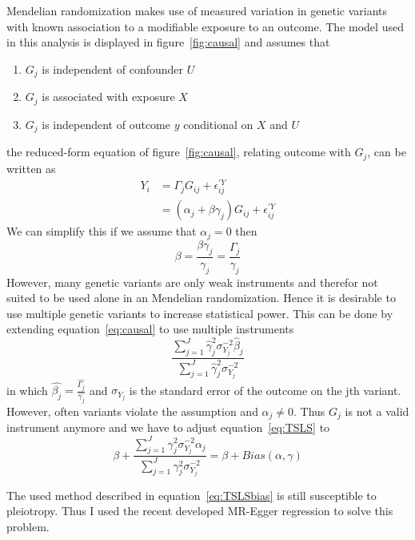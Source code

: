 Mendelian randomization makes use of measured variation in genetic variants with known association to a modifiable exposure to an outcome.
The model used in this analysis is displayed in figure~\ref{fig:causal} and assumes that

\begin{enumerate}
	\item $G_j$ is independent of confounder $U$
	\item $G_j$ is associated with exposure $X$
	\item $G_j$ is independent of outcome $y$ conditional on $X$ and $U$
\end{enumerate}

the reduced-form equation of figure~\ref{fig:causal}, relating outcome with $G_j$, can be written as
\begin{equation}
	\begin{split}
		Y_i &= \Gamma_j G_{ij} + \epsilon_{ij}^{'Y} \\
		&= (\alpha_j + \beta\gamma_j)G_{ij} + \epsilon_{ij}^{'Y}
	\end{split}
\end{equation}
We can simplify this if we assume that $\alpha_j = 0$ then
\begin{equation}
	\beta = \frac{\beta\gamma_j}{\gamma_j}= \frac{\Gamma_j}{\gamma_j}
  \label{eq:causal}
\end{equation}
However, many genetic variants are only weak instruments and therefor not suited to be used alone in an Mendelian randomization.
Hence it is desirable to use multiple genetic variants to increase statistical power.
This can be done by extending equation~\ref{eq:causal} to use multiple instruments
\begin{equation} \label{eq:TSLS}
	\frac{\sum^J_{j=1} \hat{\gamma}_j^2\sigma_{Y_j}^{-2} \hat{\beta}_j}
	{\sum^J_{j=1} \hat{\gamma}_j^2\sigma_{Y_j}^{-2}}
\end{equation}
in which $\hat{\beta_j} = \frac{\hat{\Gamma_j}}{\hat{\gamma_j}}$ and $\sigma_{Y_j}$ is the standard error of the outcome on the jth variant.
However, often variants violate the assumption and $\alpha_j \neq 0$.
Thus $G_j$ is not a valid instrument anymore and we have to adjust equation~\ref{eq:TSLS} to
\begin{equation} \label{eq:TSLSbias}
	\beta + \frac{\sum^J_{j=1} \gamma_j^2\sigma_{Y_j}^{-2} \alpha_j}
	{\sum^J_{j=1} \gamma_j^2\sigma_{Y_j}^{-2}} = \beta + Bias(\alpha, \gamma)
\end{equation}

The used method described in equation~\ref{eq:TSLSbias} is still susceptible to pleiotropy.
Thus I used the recent developed MR-Egger regression \citep{Bowden2015} to solve this problem.

